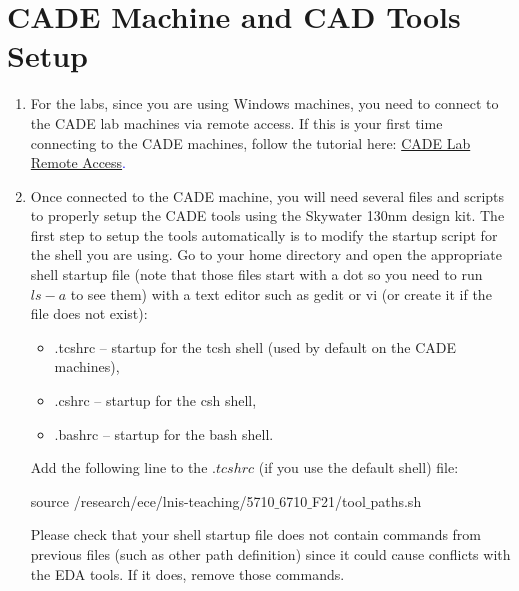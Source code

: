 \section{CADE Machine and CAD Tools Setup}
\begin{enumerate}
	\item For the labs, since you are using Windows machines, you need to connect to the CADE lab machines via remote access. If this is your first time connecting to the CADE machines, follow the tutorial here: \textcolor{blue}{\href{https://www.cade.utah.edu/faqs/do-you-have-instructions-on-using-nxnomachine/}{CADE Lab Remote Access}.}
	\item Once connected to the CADE machine, you will need several files and scripts to properly setup the CADE tools using the Skywater 130nm design kit. The first step to setup the tools automatically is to modify the startup script for the shell you are using. Go to your home directory and open the appropriate shell startup file (note that those files start with a dot so you need to run $ls -a$ to see them) with a text editor such as gedit or vi (or create it if the file does not exist):
	\begin{itemize}	
		\item .tcshrc – startup for the tcsh shell (used by default on the CADE machines),
		\item .cshrc – startup for the csh shell,
		\item .bashrc – startup for the bash shell.
	\end{itemize} 	
	Add the following line to the $.tcshrc$ (if you use the default shell) file: 
	\begin{codeline}
		source /research/ece/lnis-teaching/5710$\_$6710$\_$F21/tool$\_$paths.sh







	\end{codeline}
	\begin{warning}
		Please check that your shell startup file does not contain commands from previous files (such as other path definition) since it could cause conflicts with the EDA tools. If it does, remove those commands.
	\end{warning} 


\end{enumerate}
